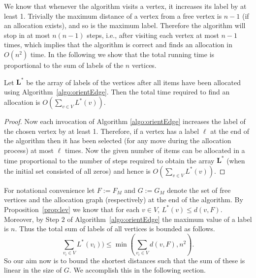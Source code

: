 %
We know that whenever the algorithm visits a vertex, it increases its label by at least 1. Trivially the maximum distance of a vertex from a free vertex is $n-1$ (if an allocation exists), and so is the maximum label. Therefore the algorithm will stop in at most $n(n-1)$ steps, i.e., after visiting each vertex at most $n-1$ times, which implies that the algorithm is correct and finds an allocation in $O(n^2)$ time. In the following we show that the total running time is proportional to the sum of labels of the $n$ vertices.
\begin{lemma}\label{lem:graph}
Let $\mathbf{L^*}$ be the array of labels of the vertices after all items have been allocated using Algorithm~\ref{algo:orientEdge}. Then the total time required to find an allocation is $O(\sum_{v\in V} L^*(v))$.
\end{lemma}
\begin{proof}
Now each invocation of Algorithm \ref{algo:orientEdge} increases the label of the chosen vertex by at least 1. Therefore, if a vertex has a label $\ell$ at the end of the algorithm then it has been selected (for any move during the allocation process) at most $\ell$ times. Now the given number of items can be allocated in a time proportional to the number of steps required to obtain the array $\mathbf{L}^*$ (when the initial set consisted of all zeros)  and hence is $O(\sum_{v\in V} L^*(v))$. 
\end{proof}
For notational convenience let $F:= F_M$ and $G:= G_M$ denote the set of free vertices and the allocation graph (respectively) at the end of the algorithm.
By Proposition~\ref{prop:lev}  we know that for each $v\in V$, $L^*(v) \le d(v,F)$. Moreover, by Step $2$ of Algorithm~\ref{algo:orientEdge} the maximum value of a label is $n$.
Thus the total sum of labels of all vertices is bounded as follows.\[\sum_{v_i\in V} L^*(v_i)) \le \min\left(\sum_{v_i\in V}d(v,F), n^2\right).\]
So our aim now is to bound the shortest distances such that the sum of these is linear in the size of $G$. We accomplish this in the following section.
